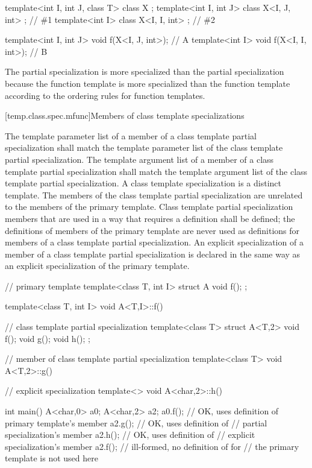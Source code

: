 \pnum
\enterexample
\begin{codeblock}
template<int I, int J, class T> class X { };
template<int I, int J>          class X<I, J, int> { };		// \#1
template<int I>                 class X<I, I, int> { };		// \#2

template<int I, int J> void f(X<I, J, int>);    // A
template<int I>        void f(X<I, I, int>);    // B
\end{codeblock}

The partial specialization
is more specialized than the partial specialization
because the function template
is more specialized than the function template
according to the ordering rules for function templates.
\exitexample

[temp.class.spec.mfunc]{Members of class template specializations}

\pnum
The template parameter list of a member of a class template partial
specialization shall match the template parameter list of the class template
partial specialization.
The template argument list of a member of a class template partial
specialization shall match the template argument list of the class template
partial specialization.
A class template specialization is a distinct template.
The members of the class template partial specialization are
unrelated to the members of the primary template.
Class template partial specialization members that are used in a way that
requires a definition shall be defined; the definitions of members of the
primary template are never used as definitions for members of a class
template partial specialization.
An explicit specialization of a member of a class template partial
specialization is declared in the same way as an explicit specialization of
the primary template.
\enterexample

\begin{codeblock}
// primary template
template<class T, int I> struct A {
	void f();
};

template<class T, int I> void A<T,I>::f() { }

// class template partial specialization
template<class T> struct A<T,2> {
	void f();
	void g();
	void h();
};

// member of class template partial specialization
template<class T> void A<T,2>::g() { }

// explicit specialization
template<> void A<char,2>::h() { }

int main()
{
	A<char,0> a0;
	A<char,2> a2;
	a0.f();                 // OK, uses definition of primary template's member
	a2.g();                 // OK, uses definition of
                                // partial specialization's member
	a2.h();                 // OK, uses definition of
                                // explicit specialization's member
	a2.f();                 // ill-formed, no definition of  for 
                                // the primary template is not used here
}
\end{codeblock}
\exitexampleb

